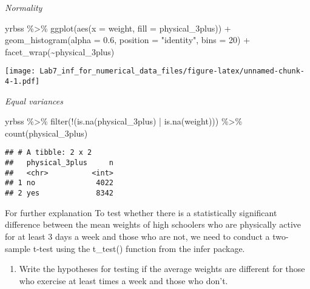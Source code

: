 \documentclass[
]{article}
\newenvironment{Shaded}{\begin{snugshade}}{\end{snugshade}}
\newcommand{\AttributeTok}[1]{\textcolor[rgb]{0.77,0.63,0.00}{#1}}
\newcommand{\DecValTok}[1]{\textcolor[rgb]{0.00,0.00,0.81}{#1}}
\newcommand{\FloatTok}[1]{\textcolor[rgb]{0.00,0.00,0.81}{#1}}
\newcommand{\FunctionTok}[1]{\textcolor[rgb]{0.00,0.00,0.00}{#1}}
\newcommand{\NormalTok}[1]{#1}
\newcommand{\SpecialCharTok}[1]{\textcolor[rgb]{0.00,0.00,0.00}{#1}}
\newcommand{\StringTok}[1]{\textcolor[rgb]{0.31,0.60,0.02}{#1}}
\providecommand{\tightlist}{%
  \setlength{\itemsep}{0pt}\setlength{\parskip}{0pt}}
\begin{document}
\emph{Normality}

\begin{Shaded}
\begin{Highlighting}[]
\NormalTok{yrbss }\SpecialCharTok{\%\textgreater{}\%}
  \FunctionTok{ggplot}\NormalTok{(}\FunctionTok{aes}\NormalTok{(}\AttributeTok{x =}\NormalTok{ weight, }\AttributeTok{fill =}\NormalTok{ physical\_3plus)) }\SpecialCharTok{+}
  \FunctionTok{geom\_histogram}\NormalTok{(}\AttributeTok{alpha =} \FloatTok{0.6}\NormalTok{, }\AttributeTok{position =} \StringTok{"identity"}\NormalTok{, }\AttributeTok{bins =} \DecValTok{20}\NormalTok{) }\SpecialCharTok{+}
  \FunctionTok{facet\_wrap}\NormalTok{(}\SpecialCharTok{\textasciitilde{}}\NormalTok{physical\_3plus)}
\end{Highlighting}
\end{Shaded}

\texttt{[image: Lab7\_inf\_for\_numerical\_data\_files/figure-latex/unnamed-chunk-4-1.pdf]}

\emph{Equal variances}

\begin{Shaded}
\begin{Highlighting}[]
\NormalTok{yrbss }\SpecialCharTok{\%\textgreater{}\%} 
  \FunctionTok{filter}\NormalTok{(}\SpecialCharTok{!}\NormalTok{(}\FunctionTok{is.na}\NormalTok{(physical\_3plus) }\SpecialCharTok{|} \FunctionTok{is.na}\NormalTok{(weight))) }\SpecialCharTok{\%\textgreater{}\%}
    \FunctionTok{count}\NormalTok{(physical\_3plus)}
\end{Highlighting}
\end{Shaded}

\begin{verbatim}
## # A tibble: 2 x 2
##   physical_3plus     n
##   <chr>          <int>
## 1 no              4022
## 2 yes             8342
\end{verbatim}

For further explanation To test whether there is a statistically
significant difference between the mean weights of high schoolers who
are physically active for at least 3 days a week and those who are not,
we need to conduct a two-sample t-test using the t\_test() function from
the infer package.

\begin{enumerate}
\def\labelenumi{\arabic{enumi}.}
\setcounter{enumi}{4}
\tightlist
\item
  Write the hypotheses for testing if the average weights are different
  for those who exercise at least times a week and those who don't.
\end{enumerate}
\end{document}
